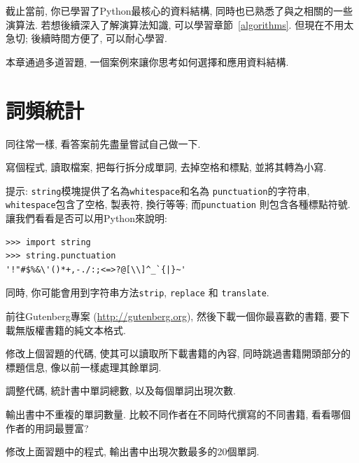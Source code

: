 \documentclass[10pt]{book}
\begin{document}
截止當前, 你已學習了Python最核心的資料結構, 
同時也已熟悉了與之相關的一些演算法. 
若想後續深入了解演算法知識, 可以學習章節~\ref{algorithms}. 
但現在不用太急切; 後續時間方便了, 可以耐心學習. 

本章通過多道習題, 一個案例來讓你思考如何選擇和應用資料結構. 


\section{詞頻統計}
\label{analysis}

同往常一樣, 看答案前先盡量嘗試自己做一下. 

\begin{exercise}

寫個程式, 讀取檔案, 把每行拆分成單詞, 去掉空格和標點, 並將其轉為小寫. 

提示: {\tt string}模塊提供了名為{\tt whitespace}和名為 
{\tt  punctuation}的字符串, {\tt whitespace}包含了空格, 製表符, 換行等等; 而{\tt punctuation} 則包含各種標點符號. 
讓我們看看是否可以用Python來說明:

\begin{verbatim}
>>> import string
>>> string.punctuation
'!"#$%&\'()*+,-./:;<=>?@[\\]^_`{|}~'
\end{verbatim}
%
同時, 你可能會用到字符串方法{\tt strip},
{\tt replace} 和 {\tt translate}.

\end{exercise}


\begin{exercise}

前往Gutenberg專案 (\url{http://gutenberg.org}), 然後下載一個你最喜歡的書籍, 
要下載無版權書籍的純文本格式. 

修改上個習題的代碼, 使其可以讀取所下載書籍的內容, 同時跳過書籍開頭部分的標題信息, 像以前一樣處理其餘單詞. 

調整代碼, 統計書中單詞總數, 以及每個單詞出現次數. 

輸出書中不重複的單詞數量. 
比較不同作者在不同時代撰寫的不同書籍, 看看哪個作者的用詞最豐富?
\end{exercise}


\begin{exercise}

修改上面習題中的程式, 輸出書中出現次數最多的20個單詞. 

\end{exercise}
\end{document}
